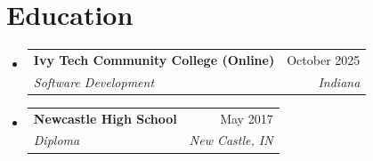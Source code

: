 \documentclass[letterpaper,11pt]{article}
\makeatletter
\newcommand{\resumeSubheading}[4]{
  \vspace{-2pt}\item
    \begin{tabular*}{0.97\textwidth}[t]{l@{\extracolsep{\fill}}r}
      \textbf{#1} & #2 \\
      \textit{\small #3} & \textit{\small #4} \\
    \end{tabular*}\vspace{-7pt}
}
\newcommand{\resumeSubHeadingListStart}{\begin{itemize}[leftmargin=0.15in, label={}]}
\newcommand{\resumeSubHeadingListEnd}{\end{itemize}}
\makeatother
\begin{document}
\section{Education}
\resumeSubHeadingListStart
  \resumeSubheading
    {Ivy Tech Community College (Online)}{October 2025}
    {Software Development}{Indiana}
  \resumeSubheading
    {Newcastle High School}{May 2017}
    {Diploma}{New Castle, IN}
\resumeSubHeadingListEnd
\end{document}
